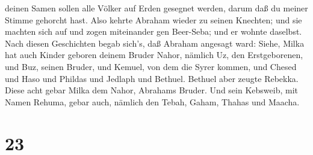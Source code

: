 deinen Samen sollen alle Völker auf Erden gesegnet werden, darum daß du
meiner Stimme gehorcht hast.  Also kehrte Abraham wieder zu
seinen Knechten; und sie machten sich auf und zogen miteinander gen
Beer-Seba; und er wohnte daselbst.  Nach diesen Geschichten
begab sich's, daß Abraham angesagt ward: Siehe, Milka hat auch Kinder
geboren deinem Bruder Nahor,  nämlich Uz, den
Erstgeborenen, und Buz, seinen Bruder, und Kemuel, von dem die Syrer
kommen,  und Chesed und Haso und Phildas und Jedlaph und
Bethuel.  Bethuel aber zeugte Rebekka. Diese acht gebar
Milka dem Nahor, Abrahams Bruder.  Und sein Kebsweib, mit
Namen Rehuma, gebar auch, nämlich den Tebah, Gaham, Thahas und Maacha.

\hypertarget{section-22}{%
\section{23}\label{section-22}}

